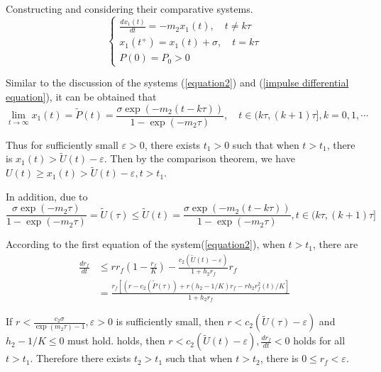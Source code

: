 \documentclass{mcmthesis}
\begin{document}
Constructing and considering their comparative systems.
\begin{equation}
  \left\{\begin{array}{l}
    \frac{d x_{1}(t)}{d t}=-m_{2} x_{1}(t), \quad t \neq k \tau \\
    x_{1}\left(t^{+}\right)=x_{1}(t)+\sigma, \quad t=k \tau     \\
    P(0)=P_{0}>0 
  \end{array}\right.
\end{equation}

Similar to the discussion of the systems (\ref{equation2}) and (\ref{impulse differential equation}), it can be obtained that
\begin{equation}
  \lim _{t \rightarrow \infty} x_{1}(t)=\tilde{P}(t)=\frac{\sigma \exp \left(-m_{2}(t-k \tau)\right)}{1-\exp \left(-m_{2} \tau\right)}, \quad t \in(k \tau,(k+1) \tau], k=0,1, \cdots
\end{equation}

Thus for sufficiently small $\varepsilon>0$, there exists $t_{1}>0$ such that when $t>t_{1}$, there is $x_{1}(t)>\tilde{U}(t)-\varepsilon$.
Then by the comparison theorem, we have $U(t) \geq x_{1}(t)>\tilde{U}(t)-\varepsilon, t>t_{1}$.

In addition, due to
\begin{equation}
  \frac{\sigma \exp \left(-m_{2} \tau\right)}{1-\exp \left(-m_{2} \tau\right)}=\tilde{U}(\tau) \leq \tilde{U}(t)=\frac{\sigma \exp \left(-m_{2}(t-k \tau)\right)}{1-\exp \left(-m_{2} \tau\right)}, t \in(k \tau,(k+1) \tau]
\end{equation}

According to the first equation of the system(\ref{equation2}), when $t>t_{1}$, there are
\begin{equation}
  \begin{aligned}
    \frac{d r_{f}}{d t} & \leq r r_{f}\left(1-\frac{r_{f}}{K}\right)-\frac{c_{2}(\tilde{U}(t)-\varepsilon)}{1+h_{2} r_{f}} r_{f}                                     \\
                        & =\frac{r_{f}\left[\left(r-c_{2}(\tilde{P}(\tau))+r\left(h_{2}-1 / K\right) r_{f}-r h_{2}  r_{f}^{2}(t) / K\right]\right.}{1+h_{2} r_{f}} 
  \end{aligned}
\end{equation}

If $r<\frac{c_{2} \sigma}{\exp \left(m_{2} \tau\right)-1}, \varepsilon>0$ is sufficiently small,
then $r<c_{2}(\tilde{U}(\tau)-\varepsilon)$ and $h_{2}-1 / K \leq 0$ must hold. holds,
then $r<c_{2}(\tilde{U}(t)-\varepsilon), \frac{d r_{f}}{d t}<0$ holds for all $t>t_{1}$.
Therefore there exists $t_{2}>t_{1}$ such that when $t>t_{2}$, there is $0 \leq r_{f}<\varepsilon$.
\end{document}
